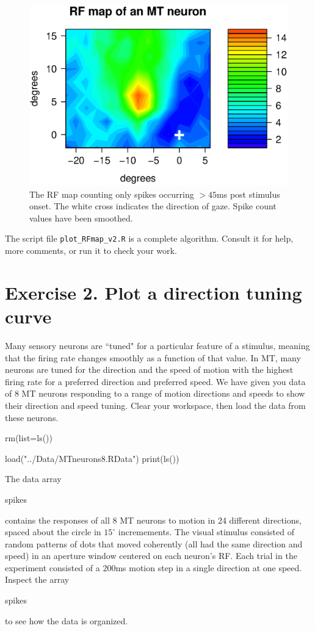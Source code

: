\documentclass[
letterpaper, %
11pt, %
 oneside, 
onecolumn, %
]{memoir}
\numberwithin{Exercise}{chapter}
\begin{document}
\begin{figure}
\centering
\includegraphics[scale=0.7]{rfmap_45} 
\caption{The RF map counting only spikes occurring $>45$ms post stimulus onset. The white cross indicates the direction of gaze. Spike count values have been smoothed.}
\end{figure}


The script file \verb+plot_RFmap_v2.R+ is a complete algorithm.  Consult it for help, more comments, or run it to check your work.

\section{Exercise 2.  Plot a direction tuning curve}

Many sensory neurons are ``tuned" for a particular feature of a stimulus, meaning that the firing rate changes smoothly as a function of that value.  In MT, many neurons are tuned for the direction and the speed of motion with the highest firing rate for a preferred direction and preferred speed.   We have given you data of 8 MT neurons responding to a range of motion directions and speeds to show their direction and speed tuning. Clear your workspace, then load the data from these neurons.

\begin{shortrcode}
rm(list=ls())

load("../Data/MTneurons8.RData")
print(ls())
\end{shortrcode}   

The data array \begin{ttfamily}spikes\end{ttfamily} contains the responses of all 8 MT neurons to motion in 24 different directions, spaced about the circle in $15^{\circ} $ incremements.  The visual stimulus consisted of random patterns of dots that moved coherently (all had the same direction and speed) in an aperture window centered on each neuron's RF.  Each trial in the experiment consisted of a 200ms motion step in a single direction at one speed.   Inspect the array \begin{ttfamily}spikes\end{ttfamily} to see how the data is organized.
\end{document}
